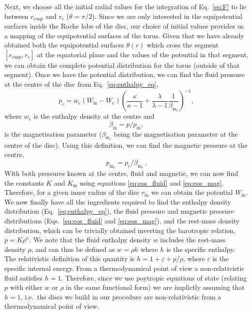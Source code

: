 \documentclass[referee]{aa}
\begin{document}
Next, we choose all the initial radial values for the integration of Eq.~\eqref{eq:F} to lie between $r_{\mathrm{cusp}}$ and $r_{\mathrm{c}}$ ($\theta = \pi / 2$). Since we are only interested in the equipotential surfaces inside the Roche lobe of the disc, our choice of initial values provides us a mapping of the equipotential surfaces of the torus. Given that we have already obtained both the equipotential surfaces $\theta(r)$ which cross the segment $[r_{\mathrm{cusp}}, r_{\mathrm{c}}]$ at the equatorial plane and the values of the potential in that segment, we can obtain the complete potential distribution for the torus (outside of that segment). Once we have the potential distribution, we can find the fluid pressure at the centre of the disc from Eq.~\eqref{eq:enthalpy_eq},
\begin{equation}
p_{\mathrm{c}} = w_{\mathrm{c}}(W_{\mathrm{in}} - W_{\mathrm{c}})\left(\frac{\kappa}{\kappa - 1} + \frac{\lambda
}{\lambda
 - 1}\frac{1}{\beta_{\mathrm{m}_{\mathrm{c}}}}\right)^{-1},
\end{equation}
where $w_{\mathrm{c}}$ is the enthalpy density at the centre and
\begin{equation}
\label{eq:beta_eq}
\beta_{\mathrm{m}} = p/p_{\mathrm{m}},
\end{equation}
is the magnetisation parameter ($\beta_{\mathrm{m}_{\mathrm{c}}}$ being the magnetisation parameter at the centre of the disc). Using this definition, we can find the magnetic pressure at the centre,
\begin{equation}
p_{\mathrm{m_{\mathrm{c}}}} = p_{\mathrm{c}}/\beta_{\mathrm{m}_{\mathrm{c}}}\,.
\end{equation}
With both pressures known at the centre, fluid and magnetic, we can now find the constants $K$ and $K_{\mathrm{m}}$ using equations \eqref{eq:eos_fluid} and \eqref{eq:eos_mag}. Therefore, for a given inner radius of the disc $r_{\mathrm{in}}$ we can obtain the potential $W_{\mathrm{in}}$. We now finally have all the ingredients required to find the enthalpy density distribution (Eq.~\eqref{eq:enthalpy_eq}), the fluid pressure and magnetic pressure distributions (Eqs.~\eqref{eq:eos_fluid} and \eqref{eq:eos_mag}), and the rest-mass density distribution, which can be trivially obtained inverting the barotropic relation, $p = K \rho^{\kappa}$. We note that the fluid enthalpy density $w$ includes the rest-mass density $\rho$, and can thus be defined as $w=\rho h$ where $h$ is the specific enthalpy. The relativistic definition of this quantity is $h=1+\varepsilon+p/\rho$, where $\varepsilon$ is
the specific internal energy. From a thermodynamical point of view a non-relativistic fluid satisfies $h=1$. Therefore,
since we use poytropic equations of state (relating $p$ with either $w$ or $\rho$ in the same functional form) we are
implictly assuming that $h=1$, i.e.~the discs we build in our procedure are non-relativistic from a thermodynamical point of view.
\end{document}
